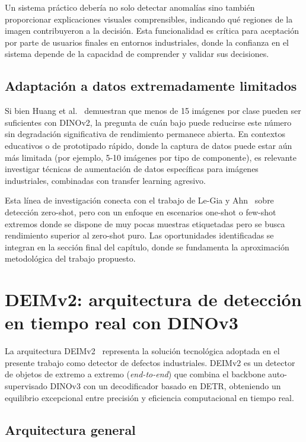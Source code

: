 Un sistema práctico debería no solo detectar anomalías sino también proporcionar explicaciones visuales comprensibles, indicando qué regiones de la imagen contribuyeron a la decisión. Esta funcionalidad es crítica para aceptación por parte de usuarios finales en entornos industriales, donde la confianza en el sistema depende de la capacidad de comprender y validar sus decisiones.

\subsection{Adaptación a datos extremadamente limitados}

Si bien Huang et al.~\cite{huang2025semiconductor} demuestran que menos de 15 imágenes por clase pueden ser suficientes con DINOv2, la pregunta de cuán bajo puede reducirse este número sin degradación significativa de rendimiento permanece abierta. En contextos educativos o de prototipado rápido, donde la captura de datos puede estar aún más limitada (por ejemplo, 5-10 imágenes por tipo de componente), es relevante investigar técnicas de aumentación de datos específicas para imágenes industriales, combinadas con transfer learning agresivo.

Esta línea de investigación conecta con el trabajo de Le-Gia y Ahn~\cite{legia2025consistent} sobre detección zero-shot, pero con un enfoque en escenarios one-shot o few-shot extremos donde se dispone de muy pocas muestras etiquetadas pero se busca rendimiento superior al zero-shot puro. Las oportunidades identificadas se integran en la sección final del capítulo, donde se fundamenta la aproximación metodológica del trabajo propuesto.

\section{DEIMv2: arquitectura de detección en tiempo real con DINOv3}
\label{sec:deimv2}

La arquitectura \acrfull{DEIMv2}~\cite{huang2025deimv2} representa la solución tecnológica adoptada en el presente trabajo como detector de defectos industriales. DEIMv2 es un detector de objetos de extremo a extremo (\textit{end-to-end}) que combina el backbone auto-supervisado \acrshort{DINOv3} con un decodificador basado en \acrshort{DETR}, obteniendo un equilibrio excepcional entre precisión y eficiencia computacional en tiempo real.

\subsection{Arquitectura general}

